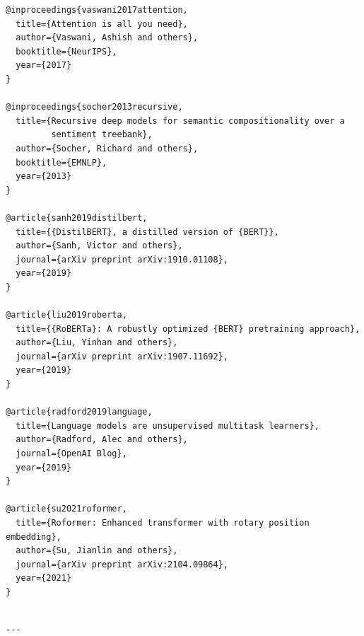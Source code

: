 \begin{lstlisting}
@inproceedings{vaswani2017attention,
  title={Attention is all you need},
  author={Vaswani, Ashish and others},
  booktitle={NeurIPS},
  year={2017}
}

@inproceedings{socher2013recursive,
  title={Recursive deep models for semantic compositionality over a 
         sentiment treebank},
  author={Socher, Richard and others},
  booktitle={EMNLP},
  year={2013}
}

@article{sanh2019distilbert,
  title={{DistilBERT}, a distilled version of {BERT}},
  author={Sanh, Victor and others},
  journal={arXiv preprint arXiv:1910.01108},
  year={2019}
}

@article{liu2019roberta,
  title={{RoBERTa}: A robustly optimized {BERT} pretraining approach},
  author={Liu, Yinhan and others},
  journal={arXiv preprint arXiv:1907.11692},
  year={2019}
}

@article{radford2019language,
  title={Language models are unsupervised multitask learners},
  author={Radford, Alec and others},
  journal={OpenAI Blog},
  year={2019}
}

@article{su2021roformer,
  title={Roformer: Enhanced transformer with rotary position embedding},
  author={Su, Jianlin and others},
  journal={arXiv preprint arXiv:2104.09864},
  year={2021}
}
\end{lstlisting}
\begin{lstlisting}

---
\end{lstlisting}